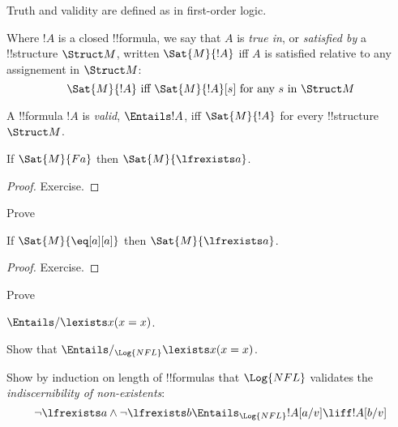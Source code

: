 \documentclass[../../../include/open-logic-section]{subfiles}
\begin{document}
Truth and validity are defined as in first-order logic.

\begin{defn}[Truth]
Where $!A$ is a closed !!{formula}, we say that $A$ is \emph{true in}, or
\emph{satisfied by} a !!{structure} $\Struct M$, written $\Sat{M}{!A}$ iff 
$A$ is satisfied relative to any assignement in $\Struct M$:
$$\Sat{M}{!A}\textrm{ iff }\Sat{M}{!A}[s]\textrm{ for any }s\textrm{ in }\Struct M$$
\end{defn}

\begin{defn}[Validity]
  A !!{formula} $!A$ is \emph{valid}, $\Entails !A$, iff $\Sat{M}{!A}$ for every
  !!{structure}~$\Struct M$.
\end{defn}

\begin{prop}
  If $\Sat{M}{Fa}$ then $\Sat{M}{\lfrexists a}$.
\end{prop}

\begin{proof}
  Exercise.
\end{proof}

\begin{prob}
  Prove 
\end{prob}

\begin{prop}
  If $\Sat{M}{\eq[a][a]}$ then $\Sat{M}{\lfrexists a}$.
\end{prop}

\begin{proof}
  Exercise.
\end{proof}

\begin{prob}
  Prove 
\end{prob}

\begin{prop}
  $\Entails/ \lexists x (x = x)$.
\end{prop}

\begin{prob}
Show that $\Entails/_{\Log{NFL}} \lexists x (x = x)$.
\end{prob}

\begin{prob}
Show by induction on length of !!{formula}s that $\Log{NFL}$ validates 
the \emph{indiscernibility of non-existents}:
$$\lnot\lfrexists a\land\lnot\lfrexists b \Entails_{\Log{NFL}} 
!A[a/v]\liff !A[b/v]$$
\end{prob}
\end{document}

